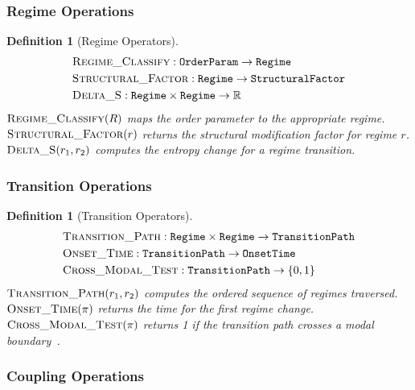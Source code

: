 \documentclass[10pt,twocolumn]{article}
\newtheorem{definition}[theorem]{Definition}
\theoremstyle{remark}
\begin{document}
\subsubsection{Regime Operations}

\begin{definition}[Regime Operators]
\label{def:regime_ops}
\begin{align}
&\textsc{Regime\_Classify} : \texttt{OrderParam} \to \texttt{Regime} \notag \\
&\textsc{Structural\_Factor} : \texttt{Regime} \to \texttt{StructuralFactor} \notag \\
&\textsc{Delta\_S} : \texttt{Regime} \times \texttt{Regime} \to \mathbb{R} \notag
\end{align}
$\textsc{Regime\_Classify}(R)$ maps the order parameter to the appropriate regime. $\textsc{Structural\_Factor}(r)$ returns the structural modification factor for regime $r$. $\textsc{Delta\_S}(r_1, r_2)$ computes the entropy change for a regime transition.
\end{definition}

\subsubsection{Transition Operations}

\begin{definition}[Transition Operators]
\label{def:trans_ops}
\begin{align}
&\textsc{Transition\_Path} : \texttt{Regime} \times \texttt{Regime} \to \texttt{TransitionPath} \notag \\
&\textsc{Onset\_Time} : \texttt{TransitionPath} \to \texttt{OnsetTime} \notag \\
&\textsc{Cross\_Modal\_Test} : \texttt{TransitionPath} \to \{0, 1\} \notag
\end{align}
$\textsc{Transition\_Path}(r_1, r_2)$ computes the ordered sequence of regimes traversed. $\textsc{Onset\_Time}(\pi)$ returns the time for the first regime change. $\textsc{Cross\_Modal\_Test}(\pi)$ returns 1 if the transition path crosses a modal boundary~\cite{varela2001brainweb,engel2001dynamic}.
\end{definition}

\subsubsection{Coupling Operations}
\end{document}
